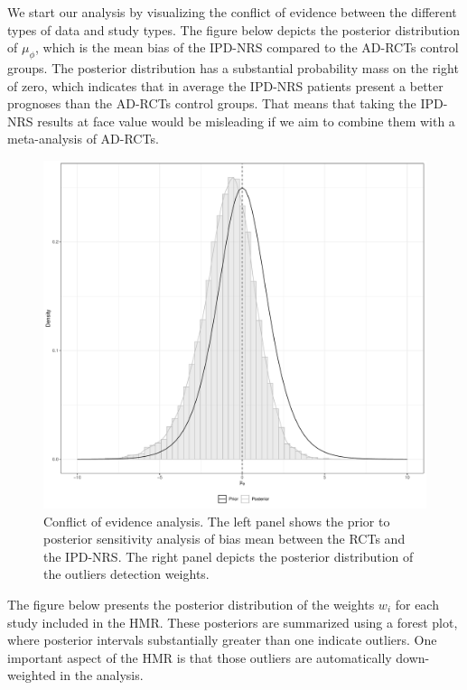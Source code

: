 \documentclass[
  letterpaper,
  DIV=11,
  numbers=noendperiod]{scrreprt}
\begin{document}
We start our analysis by visualizing the conflict of evidence between
the different types of data and study types. The figure below depicts
the posterior distribution of \(\mu_{\phi}\), which is the mean bias of
the IPD-NRS compared to the AD-RCTs control groups. The posterior
distribution has a substantial probability mass on the right of zero,
which indicates that in average the IPD-NRS patients present a better
prognoses than the AD-RCTs control groups. That means that taking the
IPD-NRS results at face value would be misleading if we aim to combine
them with a meta-analysis of AD-RCTs.

\begin{figure}

{\centering \includegraphics{chapter_11_files/figure-pdf/unnamed-chunk-6-1.pdf}

}

\caption{Conflict of evidence analysis. The left panel shows the prior
to posterior sensitivity analysis of bias mean between the RCTs and the
IPD-NRS. The right panel depicts the posterior distribution of the
outliers detection weights.}

\end{figure}

The figure below presents the posterior distribution of the weights
\(w_{i}\) for each study included in the HMR. These posteriors are
summarized using a forest plot, where posterior intervals substantially
greater than one indicate outliers. One important aspect of the HMR is
that those outliers are automatically down-weighted in the analysis.
\end{document}
